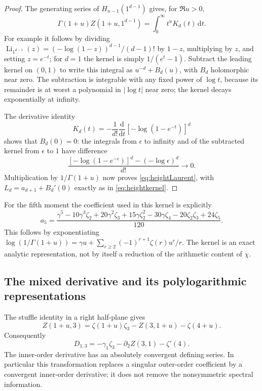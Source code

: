 \documentclass[11pt,a4paper]{article}
\numberwithin{equation}{section}
\theoremstyle{definition}
\theoremstyle{remark}
\DeclareMathOperator{\Li}{Li}
\newcommand{\dd}{\mathrm d}
\begin{document}
\begin{proof}
The generating series of $H_{n-1}(1^{d-1})$ gives, for $\Re u>0$,
\[
 \Gamma(1+u)Z(1+u,1^{d-1})=\int_0^\infty t^uK_d(t)\,\dd t.
\]
For example it follows by dividing
$\Li_{1^{d-1}}(z)=(-\log(1-z))^{d-1}/(d-1)!$
by $1-z$, multiplying by $z$, and setting $z=e^{-t}$; for $d=1$
the kernel is simply $1/(e^t-1)$.  Subtract the leading kernel on
$(0,1)$ to write this integral as $u^{-d}+B_d(u)$, with $B_d$
holomorphic near zero.  The subtraction is integrable with any fixed
power of $\log t$, because its remainder is at worst a polynomial in
$|\log t|$ near zero; the kernel decays exponentially at infinity.

The derivative identity
\[
 K_d(t)=-\frac1{d!}\frac{\dd}{\dd t}
                         [-\log(1-e^{-t})]^d
\]
shows that $B_d(0)=0$: the integrals from $\epsilon$ to infinity
and of the subtracted kernel from $\epsilon$ to $1$ have difference
\[
 \frac{[-\log(1-e^{-\epsilon})]^d-(-\log\epsilon)^d}{d!}
                         \longrightarrow0.
\]
Multiplication by $1/\Gamma(1+u)$ now proves
\eqref{eq:heightLaurent}, with $L_d=a_{d+1}+B_d'(0)$ exactly as
in \eqref{eq:heightkernel}.
\end{proof}

For the fifth moment the coefficient used in this kernel is explicitly
\begin{equation}
 a_5=\frac{\gamma^5-10\gamma^3\zeta_2+20\gamma^2\zeta_3
       +15\gamma\zeta_2^2-30\gamma\zeta_4
       -20\zeta_2\zeta_3+24\zeta_5}{120}.
 \label{eq:a5}
\end{equation}
This follows by exponentiating
$\log(1/\Gamma(1+u))=\gamma u+
\sum_{r\ge2}(-1)^{r+1}\zeta(r)u^r/r$.
The kernel is an exact analytic representation, not by itself a
reduction of the arithmetic content of $\chi$.

\subsection{The mixed derivative and its polylogarithmic representations}
\label{subsec:mixed}

The stuffle identity in a right half-plane gives
\[
 Z(1+u,3)=\zeta(1+u)\zeta_3-Z(3,1+u)-\zeta(4+u).
\]
Consequently
\begin{equation}
 D_{1,3}=-\gamma_1\zeta_3-\partial_2Z(3,1)-\zeta'(4).
 \label{eq:D13inner}
\end{equation}
The inner-order derivative has an absolutely convergent defining
series.  In particular this transformation replaces a singular
outer-order coefficient by a convergent inner-order derivative; it
does not remove the nonsymmetric spectral information.
\end{document}
